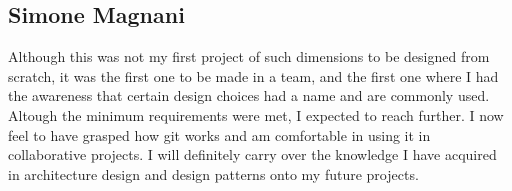 \subsection{Simone Magnani}

Although this was not my first project of such dimensions to be designed from
scratch, it was the first one to be made in a team, and the first one where I
had the awareness that certain design choices had a name and are commonly used.
Altough the minimum requirements were met, I expected to reach further.
I now feel to have grasped how git works and am comfortable in using it in collaborative projects.
I will definitely carry over the knowledge I have acquired in architecture design and design patterns
onto my future projects.
